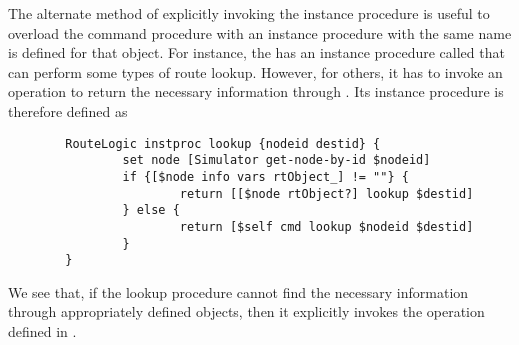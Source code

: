 \documentclass{article}
\begin{document}
The alternate method of explicitly invoking
the  instance procedure is useful 
to overload the command procedure
with an instance procedure
 with the same name is defined for that object.
For instance, the  has an instance procedure called
 that can perform some types of route lookup.  However,
for others, it has to invoke an operation to return the necessary information
through 
.
Its instance procedure is therefore defined as
\begin{verbatim}
        RouteLogic instproc lookup {nodeid destid} {
                set node [Simulator get-node-by-id $nodeid]
                if {[$node info vars rtObject_] != ""} {
                        return [[$node rtObject?] lookup $destid]
                } else {
                        return [$self cmd lookup $nodeid $destid]
                }
        }
\end{verbatim}
We see that, if the lookup procedure cannot find the necessary information
through appropriately defined objects, then it explicitly
invokes the  operation defined in .
\end{document}
